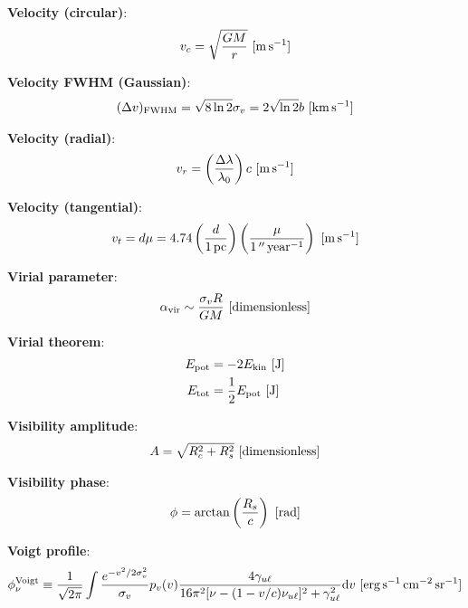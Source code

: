 \documentclass[a4paper,10pt]{article}
\begin{document}
{\noindent}\textbf{Velocity (circular)}:
\begin{align*}
    v_c = \sqrt{\frac{GM}{r}} ~ [{\rm m\,s^{-1}}]
\end{align*}

{\noindent}\textbf{Velocity FWHM (Gaussian)}:
\begin{align*}
    (\Delta v)_{\rm FWHM} = \sqrt{8\ln2}\sigma_v = 2\sqrt{\ln2}b ~ [{\rm km\,s^{-1}}]
\end{align*}

{\noindent}\textbf{Velocity (radial)}:
\begin{align*}
    v_r = \left(\frac{\Delta\lambda}{\lambda_0}\right)c ~ [{\rm m\,s^{-1}}]
\end{align*}

{\noindent}\textbf{Velocity (tangential)}:
\begin{align*}
    v_t = d\mu = 4.74\left(\frac{d}{1\,{\rm pc}}\right) \left(\frac{\mu}{1\,''\,{\rm year^{-1}}}\right) ~ [{\rm m\,s^{-1}}]
\end{align*}

{\noindent}\textbf{Virial parameter}:
\begin{align*}
    \alpha_\mathrm{vir} \sim \frac{\sigma_vR}{GM} ~ [{\rm dimensionless}]
\end{align*}

{\noindent}\textbf{Virial theorem}:
\begin{align*}
    E_\mathrm{pot} &= -2E_\mathrm{kin} ~ [{\rm J}] \\
    E_\mathrm{tot} &= \frac{1}{2}E_\mathrm{pot} ~ [{\rm J}]
\end{align*}

{\noindent}\textbf{Visibility amplitude}:
\begin{align*}
    A = \sqrt{R_c^2 + R_s^2} ~ [{\rm dimensionless}]
\end{align*}

{\noindent}\textbf{Visibility phase}:
\begin{align*}
    \phi = \arctan \left(\frac{R_s}{c}\right) ~ [{\rm rad}]
\end{align*}

{\noindent}\textbf{Voigt profile}:
\begin{align*}
    \phi_\nu^{\rm Voigt} \equiv \frac{1}{\sqrt{2\pi}} \int \frac{e^{-v^2/2\sigma_v^2}}{\sigma_v} p_v(v) \frac{4\gamma_{u\ell}}{16\pi^2[\nu-(1-v/c)\nu_{u\ell}]^2 + \gamma_{u\ell}^2}{\rm d}v  ~ [{\rm erg\,s^{-1}\,cm^{-2}\,sr^{-1}}]
\end{align*}
\end{document}
